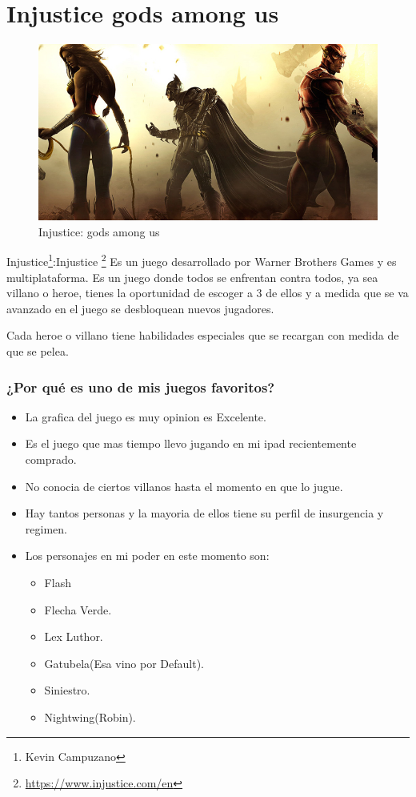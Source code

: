 \section{Injustice gods among us}

\begin{figure}[htbp]
\begin{center}
\includegraphics[width=.60\textwidth]{./imagenes/InjusticeGame.jpg}
\caption{Injustice: gods among us}
\label{Injustice: Gods Amoung us}
\end{center}
\end{figure}
Injustice\footnote{Kevin Campuzano}:Injustice \footnote{\url{https://www.injustice.com/en}} Es un juego desarrollado por Warner Brothers Games y es multiplataforma. Es un juego donde todos se enfrentan contra todos, ya sea villano o heroe, tienes la oportunidad de escoger a 3 de ellos y a medida que se va avanzado en el juego se desbloquean nuevos jugadores.

Cada heroe o villano tiene habilidades especiales que se recargan con medida de que se pelea.

\subsubsection{¿Por qué es uno de mis juegos favoritos?}
\begin{itemize}
	\item La grafica del juego es muy opinion es Excelente.
	\item Es el juego que mas tiempo llevo jugando en mi ipad recientemente comprado.
	\item No conocia de ciertos villanos hasta el momento en que lo jugue.
	\item Hay tantos personas y la mayoria de ellos tiene su perfil de insurgencia y regimen.
	\item Los personajes en mi poder en este momento son:
		\begin{itemize}
			\item Flash
			\item Flecha Verde.
			\item Lex Luthor.
			\item Gatubela(Esa vino por Default).
			\item Siniestro.
			\item Nightwing(Robin).
		\end{itemize}	
\end{itemize}